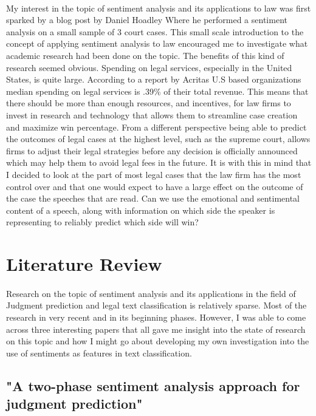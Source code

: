 \documentclass[12pt,english]{article}
\begin{document}
\paragraph{}
My interest in the topic of sentiment analysis and its applications to law was first sparked by a blog post by Daniel Hoadley Where he performed a sentiment analysis on a small sample of 3 court cases\citep{hoadley_daniel_sentiment_2017}. This small scale introduction to the concept of applying sentiment analysis to law encouraged me to investigate what academic research had been done on the topic. The benefits of this kind of research seemed obvious. Spending on legal services, especially in the United States, is quite large. According to a report by Acritas U.S based organizations median spending on legal services is .39\% of their total revenue\citep{}. This means that there should be more than enough resources, and incentives, for law firms to invest in research and technology that allows them to streamline case creation and maximize win percentage. From a different perspective being able to predict the outcomes of legal cases at the highest level, such as the supreme court, allows firms to adjust their legal strategies before any decision is officially announced which may help them to avoid legal fees in the future. It is with this in mind that I decided to look at the part of most legal cases that the law firm has the most control over and that one would expect to have a large effect on the outcome of the case the speeches that are read. Can we use the emotional and sentimental content of a speech, along with information on which side the speaker is representing to reliably predict which side will win?

\section{Literature Review}
\paragraph{}
Research on the topic of sentiment analysis and its applications in the field of Judgment prediction and legal text classification is relatively sparse. Most of the research in very recent and in its beginning phases. However, I was able to come across three interesting papers that all gave me insight into the state of research on this topic and how I might go about developing my own investigation into the use of sentiments as features in text classification. 
\subsection{"A two-phase sentiment analysis approach for judgment prediction"}
\end{document}
